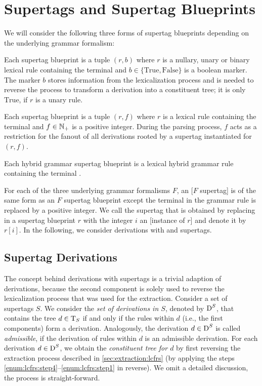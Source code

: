 \documentclass[../../document.tex]{subfiles}
\begin{document}
    \section{Supertags and Supertag Blueprints}\label{sec:supertags}
    We will consider the following three forms of supertag blueprints depending on the underlying grammar formalism:
    \begin{compactenum}
        \item
            Each  supertag blueprint is a tuple \((r, b)\) where \(r\) is a nullary, unary or binary lexical  rule containing the terminal \wildcard{} and \(b \in \{\text{True}, \text{False}\}\) is a boolean marker.
            The marker \(b\) stores information from the lexicalization process and is needed to reverse the process to transform a derivation into a constituent tree; it is only \(\text{True}\), if \(r\) is a unary rule.
        \item
            Each  supertag blueprint is a tuple \((r, f)\) where \(r\) is a lexical  rule containing the terminal \wildcard{} and \(f \in \mathbb{N}_+\) is a positive integer.
            During the parsing process, \(f\) acts as a restriction for the fanout of all derivations rooted by a supertag instantiated for \((r,f)\).
        \item Each hybrid grammar supertag blueprint is a lexical hybrid grammar rule containing the terminal \wildcard{}.
    \end{compactenum}
    For each of the three underlying grammar formalisms \(F\), an [\(F\) supertag] is of the same form as an \(F\) supertag blueprint except the terminal \wildcard{} in the grammar rule is replaced by a positive integer.
    We call the supertag that is obtained by replacing \wildcard{} in a supertag blueprint \(r\) with the integer \(i\) an [instance of \(r\)] and denote it by \(r[i]\).
    In the following, we consider derivations with  and  supertags.

    \subsection*{ Supertag Derivations}
    The concept behind derivations with  supertags is a trivial adaption of  derivations, because the second component is solely used to reverse the lexicalization process that was used for the extraction.
    Consider a set of  supertags \(S\).
    We consider the \emph{set of derivations in \(S\)}, denoted by \(\operatorname{D}^S\), that contains the tree \(d \in \operatorname{T}_S\) if and only if the  rules within \(d\) (i.e., the first components) form a derivation.
    Analogously, the derivation \(d\in \operatorname{D}^S\) is called \emph{admissible}, if the derivation of  rules within \(d\) is an admissible derivation.
    For each derivation \(d \in \operatorname{D}^S\), we obtain the \emph{constituent tree for \(d\)} by first reversing the extraction process described in \cref{sec:extraction:lcfrs} (by applying the steps \ref{enum:lcfrs:step4}--\ref{enum:lcfrs:step1} in reverse).
    We omit a detailed discussion, the process is straight-forward.
\end{document}
